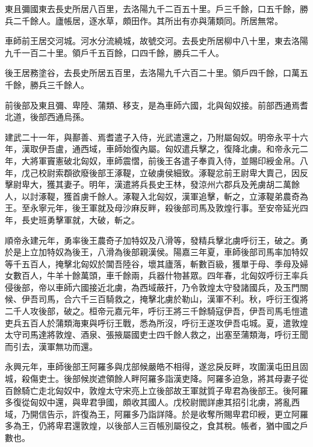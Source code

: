 \begin{pinyinscope}
東且彌國東去長史所居八百里，去洛陽九千二百五十里。戶三千餘，口五千餘，勝兵二千餘人。廬帳居，逐水草，頗田作。其所出有亦與蒲類同。所居無常。

車師前王居交河城。河水分流繞城，故號交河。去長史所居柳中八十里，東去洛陽九千一百二十里。領戶千五百餘，口四千餘，勝兵二千人。

後王居務塗谷，去長史所居五百里，去洛陽九千六百二十里。領戶四千餘，口萬五千餘，勝兵三千餘人。

前後部及東且彌、卑陸、蒲類、移支，是為車師六國，北與匈奴接。前部西通焉耆北道，後部西通烏孫。

建武二十一年，與鄯善、焉耆遣子入侍，光武遣還之，乃附屬匈奴。明帝永平十六年，漢取伊吾盧，通西域，車師始復內屬。匈奴遣兵擊之，復降北虜。和帝永元二年，大將軍竇憲破北匈奴，車師震慴，前後王各遣子奉貢入侍，並賜印綬金帛。八年，戊己校尉索頵欲廢後部王涿鞮，立破虜侯細致。涿鞮忿前王尉卑大賣己，因反擊尉卑大，獲其妻子。明年，漢遣將兵長史王林，發涼州六郡兵及羌虜胡二萬餘人，以討涿鞮，獲首虜千餘人。涿鞮入北匈奴，漢軍追擊，斬之，立涿鞮弟農奇為王。至永寧元年，後王軍就及母沙麻反畔，殺後部司馬及敦煌行事。至安帝延光四年，長史班勇擊軍就，大破，斬之。

順帝永建元年，勇率後王農奇子加特奴及八滑等，發精兵擊北虜呼衍王，破之。勇於是上立加特奴為後王，八滑為後部親漢侯。陽嘉三年夏，車師後部司馬率加特奴等千五百人，掩擊北匈奴於閶吾陸谷，壞其廬落，斬數百級，獲單于母、季母及婦女數百人，牛羊十餘萬頭，車千餘兩，兵器什物甚眾。四年春，北匈奴呼衍王率兵侵後部，帝以車師六國接近北虜，為西域蔽扞，乃令敦煌太守發諸國兵，及玉門關候、伊吾司馬，合六千三百騎救之，掩擊北虜於勒山，漢軍不利。秋，呼衍王復將二千人攻後部，破之。桓帝元嘉元年，呼衍王將三千餘騎寇伊吾，伊吾司馬毛愷遣吏兵五百人於蒲類海東與呼衍王戰，悉為所沒，呼衍王遂攻伊吾屯城。夏，遣敦煌太守司馬達將敦煌、酒泉、張掖屬國吏士四千餘人救之，出塞至蒲類海，呼衍王聞而引去，漢軍無功而還。

永興元年，車師後部王阿羅多與戊部候嚴皓不相得，遂忿戾反畔，攻圍漢屯田且固城，殺傷吏士。後部候炭遮領餘人畔阿羅多詣漢吏降。阿羅多迫急，將其母妻子從百餘騎亡走北匈奴中，敦煌太守宋亮上立後部故王軍就質子卑君為後部王。後阿羅多復從匈奴中還，與卑君爭國，頗收其國人。戊校尉閻詳慮其招引北虜，將亂西域，乃開信告示，許復為王，阿羅多乃詣詳降。於是收奪所賜卑君印綬，更立阿羅多為王，仍將卑君還敦煌，以後部人三百帳別屬役之，食其稅。帳者，猶中國之戶數也。


\end{pinyinscope}
